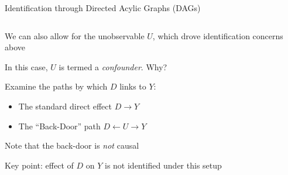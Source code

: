 \documentclass[notes,11pt, aspectratio=169]{beamer}
\newenvironment{wideitemize}{\itemize\addtolength{\itemsep}{10pt}}{\enditemize}
\begin{document}
\begin{frame}{Identification through Directed Acylic Graphs (DAGs)}
\begin{columns}[T] %
  \begin{column}{.5\textwidth}
    \begin{wideitemize}
    \item We can also allow for the unobservable $U$, which drove
      identification concerns above
    \item In this case, $U$ is termed a \emph{confounder}. Why?
    \item Examine the paths by which $D$ links to $Y$:
      \begin{itemize}
      \item The standard direct effect $D \rightarrow Y$
      \item The ``Back-Door'' path $D \leftarrow U \rightarrow Y$
      \end{itemize}
    \item Note that the back-door is \emph{not} causal
    \item Key point: effect of $D$ on $Y$ is not identified under this setup
    \end{wideitemize}
  \end{column}%
  \hfill%
  \begin{column}{.5\textwidth}
    \begin{center}
    \end{center}
  \end{column}
\end{columns}
\end{frame}
\end{document}
